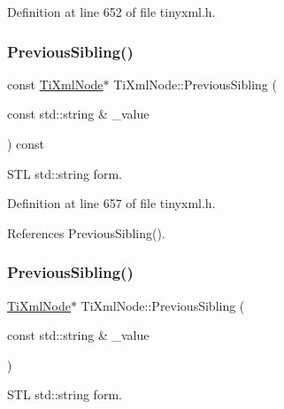 Definition at line 652 of file tinyxml.\+h.

\hypertarget{class_ti_xml_node_a64ee1c722b607040cd02bd0fd05eb04a}{}\label{class_ti_xml_node_a64ee1c722b607040cd02bd0fd05eb04a} 
\subsubsection{\texorpdfstring{Previous\+Sibling()}{PreviousSibling()}\hspace{0.1cm}{\footnotesize\ttfamily [5/6]}}
{\footnotesize\ttfamily const \hyperlink{class_ti_xml_node}{Ti\+Xml\+Node}$\ast$ Ti\+Xml\+Node\+::\+Previous\+Sibling (\begin{DoxyParamCaption}\item[{const std\+::string \&}]{\+\_\+value }\end{DoxyParamCaption}) const\hspace{0.3cm}{\ttfamily [inline]}}



S\+TL std\+::string form. 



Definition at line 657 of file tinyxml.\+h.



References Previous\+Sibling().

\hypertarget{class_ti_xml_node_acc8a0434c7f401d4a3b6dee77c1a5912}{}\label{class_ti_xml_node_acc8a0434c7f401d4a3b6dee77c1a5912} 
\subsubsection{\texorpdfstring{Previous\+Sibling()}{PreviousSibling()}\hspace{0.1cm}{\footnotesize\ttfamily [6/6]}}
{\footnotesize\ttfamily \hyperlink{class_ti_xml_node}{Ti\+Xml\+Node}$\ast$ Ti\+Xml\+Node\+::\+Previous\+Sibling (\begin{DoxyParamCaption}\item[{const std\+::string \&}]{\+\_\+value }\end{DoxyParamCaption})\hspace{0.3cm}{\ttfamily [inline]}}



S\+TL std\+::string form. 




